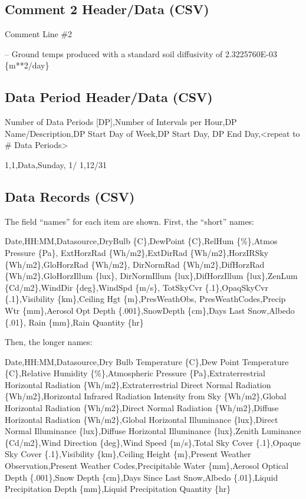 \subsection{Comment 2 Header/Data (CSV)}\label{comment-2-headerdata-csv}

Comment Line \#2

-- Ground temps produced with a standard soil diffusivity of 2.3225760E-03 \{m**2/day\}

\subsection{Data Period Header/Data (CSV)}\label{data-period-headerdata-csv}

Number of Data Periods {[}DP{]},Number of Intervals per Hour,DP Name/Description,DP Start Day of Week,DP Start Day, DP End Day,\textless{}repeat to \# Data Periods\textgreater{}

1,1,Data,Sunday, 1/ 1,12/31

\subsection{Data Records (CSV)}\label{data-records-csv}

The field ``names'' for each item are shown. First, the ``short'' names:

Date,HH:MM,Datasource,DryBulb \{C\},DewPoint \{C\},RelHum \{\%\},Atmos Pressure \{Pa\}, ExtHorzRad \{Wh/m2\},ExtDirRad \{Wh/m2\},HorzIRSky \{Wh/m2\},GloHorzRad \{Wh/m2\}, DirNormRad \{Wh/m2\},DifHorzRad \{Wh/m2\},GloHorzIllum \{lux\}, DirNormIllum \{lux\},DifHorzIllum \{lux\},ZenLum \{Cd/m2\},WindDir \{deg\},WindSpd \{m/s\}, TotSkyCvr \{.1\},OpaqSkyCvr \{.1\},Visibility \{km\},Ceiling Hgt \{m\},PresWeathObs, PresWeathCodes,Precip Wtr \{mm\},Aerosol Opt Depth \{.001\},SnowDepth \{cm\},Days Last Snow,Albedo \{.01\}, Rain \{mm\},Rain Quantity \{hr\}

Then, the longer names:

Date,HH:MM,Datasource,Dry Bulb Temperature \{C\},Dew Point Temperature \{C\},Relative Humidity \{\%\},Atmospheric Pressure \{Pa\},Extraterrestrial Horizontal Radiation \{Wh/m2\},Extraterrestrial Direct Normal Radiation \{Wh/m2\},Horizontal Infrared Radiation Intensity from Sky \{Wh/m2\},Global Horizontal Radiation \{Wh/m2\},Direct Normal Radiation \{Wh/m2\},Diffuse Horizontal Radiation \{Wh/m2\},Global Horizontal Illuminance \{lux\},Direct Normal Illuminance \{lux\},Diffuse Horizontal Illuminance \{lux\},Zenith Luminance \{Cd/m2\},Wind Direction \{deg\},Wind Speed \{m/s\},Total Sky Cover \{.1\},Opaque Sky Cover \{.1\},Visibility \{km\},Ceiling Height \{m\},Present Weather Observation,Present Weather Codes,Precipitable Water \{mm\},Aerosol Optical Depth \{.001\},Snow Depth \{cm\},Days Since Last Snow,Albedo \{.01\},Liquid Precipitation Depth \{mm\},Liquid Precipitation Quantity \{hr\}

